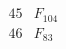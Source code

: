 \documentclass{article}
\begin{document}
{$$\begin{array}{|r|*{7}{r|}}
 & 
 & 
 & 
 & 
\\
\hline
45 
 & F_{104} &
 & 
 & 
 & 
 & 
 & 
\\
\hline
46 
 & F_{83} &
 & 
 & 
 & 
 & 
 & 

\end{array}$$}
\end{document}
